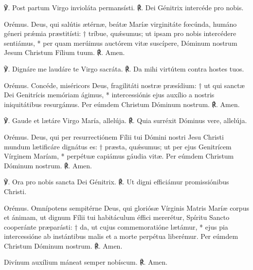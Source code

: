 ℣. Post partum Virgo invioláta permansísti.
℟. Dei Génitrix intercéde pro nobis.

Orémus.
Deus, qui salútis ætérnæ, 
beátæ Maríæ virginitáte fœcúnda,
humáno géneri prǽmia præstitísti: †
tríbue, quǽsumus; ut ipsam pro nobis intercédere sentiámus, *
per quam merúimus auctórem vitæ suscípere,
Dóminum nostrum Jesum Christum Fílium tuum.
℟. Amen.



℣. Dignáre me laudáre te Virgo sacráta.
℟. Da mihi virtútem contra hostes tuos.

Orémus.
Concéde, miséricors Deus, fragilitáti nostræ præsídium: †
ut qui sanctæ Dei Genitrícis memóriam ágimus, *
intercessiónis ejus auxílio a nostris iniquitátibus resurgámus.
Per eúmdem Christum Dóminum nostrum.
℟. Amen. 




℣. Gaude et lætáre Virgo María, allelúja.
℟. Quia surréxit Dóminus vere, allelúja.

Orémus.
Deus, qui per resurrectiónem Fílii tui Dómini nostri Jesu Christi
mundum lætificáre dignátus es: †
præsta, quǽsumus; ut per ejus Genitrícem Vírginem Maríam, *
perpétuæ capiámus gáudia vitæ.
Per eúmdem Christum Dóminum nostrum.
℟. Amen. 



℣. Ora pro nobis sancta Dei Génitrix.
℟. Ut digni efficiámur promissiónibus Christi.

Orémus.
Omnípotens sempitérne Deus,
qui gloriósæ Vírginis Matris Maríæ corpus et ánimam,
ut dignum Fílii tui habitáculum éffici mererétur,
Spíritu Sancto cooperánte præparásti: †
da, ut cujus commemoratióne lætámur, *
ejus pia intercessióne ab instántibus malis et a morte perpétua liberémur.
Per eúmdem Christum Dóminum nostrum. 
℟. Amen.


Divínum auxílium máneat semper nobíscum.
℟. Amen.
